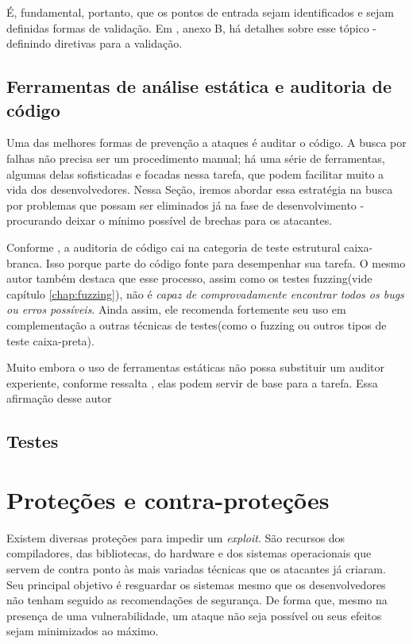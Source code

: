 			É, fundamental, portanto, que os pontos de entrada sejam identificados e sejam
			definidas formas de validação. Em \cite{Secure2006}, anexo B, há detalhes sobre
			esse tópico - definindo diretivas para a validação.
			
		\subsection{Ferramentas de análise estática e auditoria de código}
			Uma das melhores formas de prevenção a ataques é auditar o código. 
			A busca por falhas não precisa ser um procedimento manual; há uma série de ferramentas,
			algumas delas sofisticadas e focadas nessa tarefa, que podem facilitar muito a vida
			dos desenvolvedores.
			Nessa Seção, iremos abordar essa estratégia na busca por problemas 
			que possam ser eliminados já na fase de desenvolvimento - procurando
			deixar o mínimo possível de brechas para os atacantes.
			
			
			Conforme \cite{Ari2008}, a auditoria de código cai na categoria de teste
			estrutural caixa-branca. Isso porque parte do código fonte para desempenhar sua tarefa.
			O mesmo autor também destaca que esse processo,
			assim como os testes fuzzing(vide capítulo \ref{chap:fuzzing}), não é
			\textsl{capaz de comprovadamente encontrar todos os \textsl{bugs} ou erros possíveis}. 
			Ainda assim, ele recomenda fortemente seu uso em complementação a outras técnicas
			de testes(como o fuzzing ou outros tipos de teste caixa-preta).


			Muito embora o uso de ferramentas estáticas não possa substituir um auditor experiente,
			conforme ressalta \cite{Anley2007}, elas podem servir de base para a tarefa.
			Essa afirmação desse autor 

		\subsection{Testes}
		
	
	\section{Proteções e contra-proteções}
	\label{sec:exploit_protection}
		Existem diversas proteções para impedir um \textsl{exploit}.
		São recursos dos compiladores, das bibliotecas, do hardware e dos sistemas operacionais
		que servem de contra ponto às mais variadas técnicas que os atacantes já criaram.
		Seu principal objetivo é resguardar os sistemas mesmo que os desenvolvedores
		não tenham seguido as recomendações de segurança. De forma que, mesmo na presença de uma
		vulnerabilidade, um ataque não seja possível ou seus efeitos sejam minimizados ao máximo.
		
